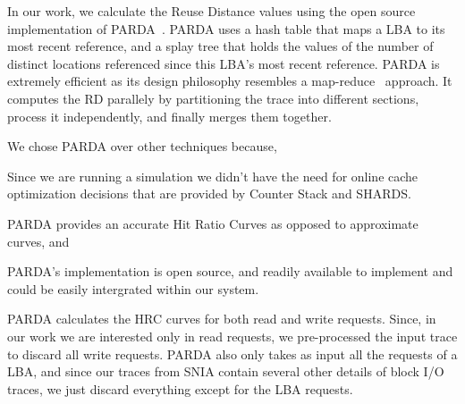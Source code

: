 In our work, we calculate the Reuse Distance values using the open source implementation of PARDA~\cite{niu_parda:_2012}. PARDA uses a hash table that maps a LBA to its most recent reference, and a splay tree that holds the values of the number of distinct locations referenced since this LBA's most recent reference. PARDA is extremely efficient as its design philosophy resembles a map-reduce~\cite{} approach. It computes the RD parallely by partitioning the trace into different sections, process it independently, and finally merges them together. 

We chose PARDA over other techniques because,
\begin{enumerate*}
\item Since we are running a simulation we didn't have the need for online cache optimization decisions that are provided by Counter Stack and SHARDS. 
\item PARDA provides an accurate Hit Ratio Curves as opposed to approximate curves, and 
\item PARDA's implementation is open source, and readily available to implement and could be easily intergrated within our system. 
\end{enumerate*}
PARDA calculates the HRC curves for both read and write requests. Since, in our work we are interested only in read requests, we pre-processed the input trace to discard all write requests. PARDA also only takes as input all the requests of a LBA, and since our traces from SNIA contain several other details of block I/O traces, we just discard everything except for the LBA requests. 



